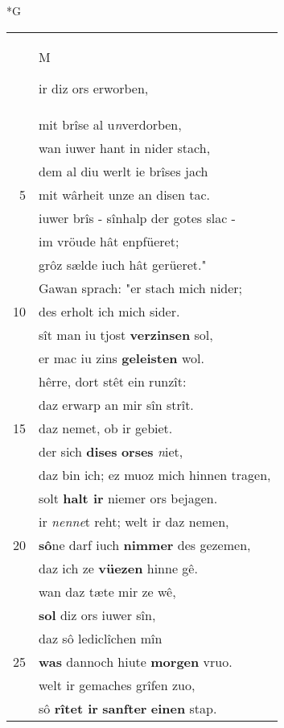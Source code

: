 \documentclass[8pt,a4paper,notitlepage]{article}
\begin{document}
\newpage
\begin{table}[ht]
\begin{minipage}[t]{0.5\linewidth}
\small
\begin{center}*G
\end{center}
\begin{tabular}{rl}
 & \begin{large}M\end{large}ir diz ors erworben,\\ 
 & mit brîse al u\textit{n}verdorben,\\ 
 & wan iuwer hant in nider stach,\\ 
 & dem al diu werlt ie brîses jach\\ 
5 & mit wârheit unze an disen tac.\\ 
 & iuwer brîs - sînhalp der gotes slac -\\ 
 & im vröude hât enpfüeret;\\ 
 & grôz sælde iuch hât gerüeret."\\ 
 & Gawan sprach: "er stach mich nider;\\ 
10 & des erholt ich mich sider.\\ 
 & sît man iu tjost \textbf{verzinsen} sol,\\ 
 & er mac iu zins \textbf{geleisten} wol.\\ 
 & hêrre, dort stêt ein runzît:\\ 
 & daz erwarp an mir sîn strît.\\ 
15 & daz nemet, ob ir gebiet.\\ 
 & der sich \textbf{dises} \textbf{orses} \textit{n}iet,\\ 
 & daz bin ich; ez muoz mich hinnen tragen,\\ 
 & solt \textbf{halt ir} niemer ors bejagen.\\ 
 & ir \textit{nenne}t reht; welt ir daz nemen,\\ 
20 & \textbf{sô}ne darf iuch \textbf{nimmer} des gezemen,\\ 
 & daz ich ze \textbf{vüezen} hinne gê.\\ 
 & wan daz tæte mir ze wê,\\ 
 & \textbf{sol} diz ors iuwer sîn,\\ 
 & daz sô lediclîchen mîn\\ 
25 & \textbf{was} dannoch hiute \textbf{morgen} vruo.\\ 
 & welt ir gemaches grîfen zuo,\\ 
 & sô \textbf{rîtet ir} \textbf{sanfter} \textbf{einen} stap.\\ 

\end{tabular}
\end{minipage}
\end{table}
\end{document}
